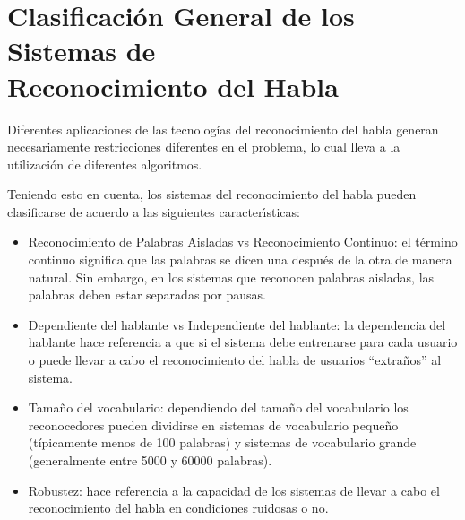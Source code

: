 \section[Clasificaci\'on General de los Sistemas de Reconocimiento del Habla]
{Clasificaci\'on General de los Sistemas de \\ Reconocimiento del Habla}

Diferentes aplicaciones de las tecnolog\'ias del reconocimiento del habla generan necesariamente 
restricciones diferentes en el problema, lo cual lleva a la utilizaci\'on de diferentes 
algoritmos\cite{Jurafsky}.

Teniendo esto en cuenta, los sistemas del reconocimiento del habla pueden clasificarse de acuerdo
a las siguientes caracter{\'\i}sticas:

\begin{itemize}
    \item Reconocimiento de Palabras Aisladas vs Reconocimiento Continuo: el t\'ermino continuo 
    significa que las palabras se dicen una despu\'es de la otra de manera natural. Sin embargo, en 
    los sistemas que reconocen palabras aisladas, las palabras deben estar separadas por pausas.
    \item Dependiente del hablante vs Independiente del hablante: la dependencia del hablante hace
    referencia a que si el sistema debe entrenarse para cada usuario o puede llevar a cabo el
    reconocimiento del habla de usuarios ``extra\~nos'' al sistema.
    \item Tama\~no del vocabulario: dependiendo del tama\~no del vocabulario los reconocedores pueden 
    dividirse en sistemas de vocabulario peque\~no (t\'ipicamente menos de 100 palabras) y sistemas de
    vocabulario grande (generalmente entre 5000 y 60000 palabras).
    \item Robustez: hace referencia a la capacidad de los sistemas de llevar a cabo el 
        reconocimiento del habla en condiciones ruidosas o no.
\end{itemize}
